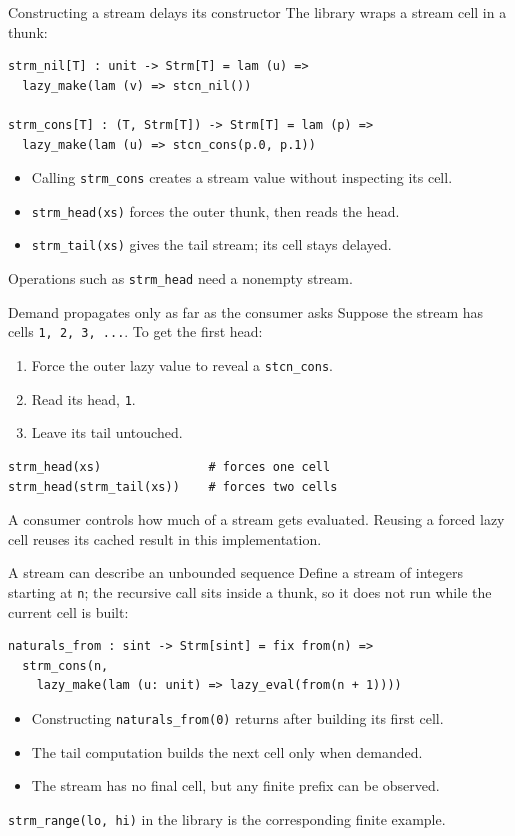 \documentclass[aspectratio=169,10pt]{beamer}
\begin{document}
\begin{frame}[fragile]{Constructing a stream delays its constructor}
  The library wraps a stream cell in a thunk:
  \begin{lstlisting}
strm_nil[T] : unit -> Strm[T] = lam (u) =>
  lazy_make(lam (v) => stcn_nil())

strm_cons[T] : (T, Strm[T]) -> Strm[T] = lam (p) =>
  lazy_make(lam (u) => stcn_cons(p.0, p.1))
  \end{lstlisting}
  \begin{itemize}
    \item Calling \texttt{strm\_cons} creates a stream value without inspecting its cell.
    \item \texttt{strm\_head(xs)} forces the outer thunk, then reads the head.
    \item \texttt{strm\_tail(xs)} gives the tail stream; its cell stays delayed.
  \end{itemize}
  Operations such as \texttt{strm\_head} need a nonempty stream.
\end{frame}

\begin{frame}[fragile]{Demand propagates only as far as the consumer asks}
  Suppose the stream has cells \texttt{1, 2, 3, ...}. To get the first head:
  \begin{enumerate}
    \item Force the outer lazy value to reveal a \texttt{stcn\_cons}.
    \item Read its head, \texttt{1}.
    \item Leave its tail untouched.
  \end{enumerate}
  \begin{lstlisting}
strm_head(xs)               # forces one cell
strm_head(strm_tail(xs))    # forces two cells
  \end{lstlisting}
  A consumer controls how much of a stream gets evaluated. Reusing a forced
  lazy cell reuses its cached result in this implementation.
\end{frame}

\begin{frame}[fragile]{A stream can describe an unbounded sequence}
  Define a stream of integers starting at \texttt{n}; the recursive call sits
  inside a thunk, so it does not run while the current cell is built:
  \begin{lstlisting}
naturals_from : sint -> Strm[sint] = fix from(n) =>
  strm_cons(n,
    lazy_make(lam (u: unit) => lazy_eval(from(n + 1))))
  \end{lstlisting}
  \begin{itemize}
    \item Constructing \texttt{naturals\_from(0)} returns after building its first cell.
    \item The tail computation builds the next cell only when demanded.
    \item The stream has no final cell, but any finite prefix can be observed.
  \end{itemize}
  \texttt{strm\_range(lo, hi)} in the library is the corresponding finite example.
\end{frame}
\end{document}
